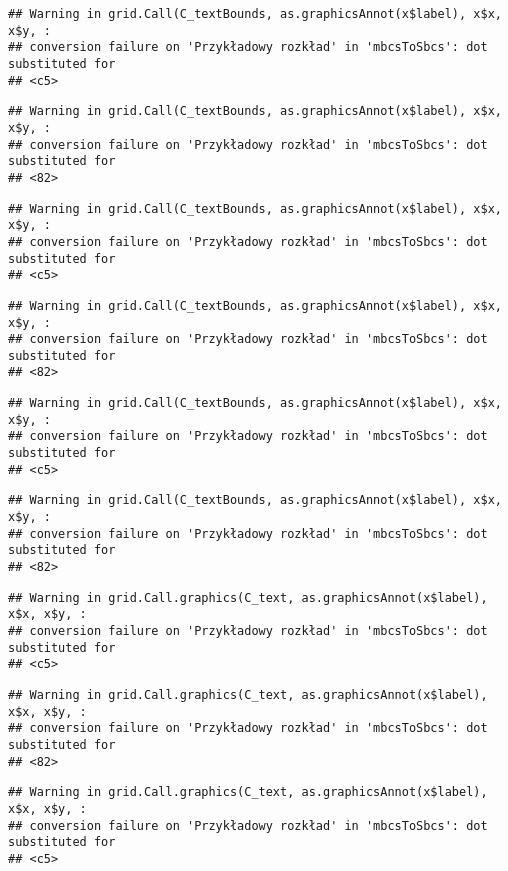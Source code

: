 \documentclass[
]{book}
\begin{document}
\begin{verbatim}
## Warning in grid.Call(C_textBounds, as.graphicsAnnot(x$label), x$x, x$y, :
## conversion failure on 'Przykładowy rozkład' in 'mbcsToSbcs': dot substituted for
## <c5>
\end{verbatim}

\begin{verbatim}
## Warning in grid.Call(C_textBounds, as.graphicsAnnot(x$label), x$x, x$y, :
## conversion failure on 'Przykładowy rozkład' in 'mbcsToSbcs': dot substituted for
## <82>
\end{verbatim}

\begin{verbatim}
## Warning in grid.Call(C_textBounds, as.graphicsAnnot(x$label), x$x, x$y, :
## conversion failure on 'Przykładowy rozkład' in 'mbcsToSbcs': dot substituted for
## <c5>
\end{verbatim}

\begin{verbatim}
## Warning in grid.Call(C_textBounds, as.graphicsAnnot(x$label), x$x, x$y, :
## conversion failure on 'Przykładowy rozkład' in 'mbcsToSbcs': dot substituted for
## <82>
\end{verbatim}

\begin{verbatim}
## Warning in grid.Call(C_textBounds, as.graphicsAnnot(x$label), x$x, x$y, :
## conversion failure on 'Przykładowy rozkład' in 'mbcsToSbcs': dot substituted for
## <c5>
\end{verbatim}

\begin{verbatim}
## Warning in grid.Call(C_textBounds, as.graphicsAnnot(x$label), x$x, x$y, :
## conversion failure on 'Przykładowy rozkład' in 'mbcsToSbcs': dot substituted for
## <82>
\end{verbatim}

\begin{verbatim}
## Warning in grid.Call.graphics(C_text, as.graphicsAnnot(x$label), x$x, x$y, :
## conversion failure on 'Przykładowy rozkład' in 'mbcsToSbcs': dot substituted for
## <c5>
\end{verbatim}

\begin{verbatim}
## Warning in grid.Call.graphics(C_text, as.graphicsAnnot(x$label), x$x, x$y, :
## conversion failure on 'Przykładowy rozkład' in 'mbcsToSbcs': dot substituted for
## <82>
\end{verbatim}

\begin{verbatim}
## Warning in grid.Call.graphics(C_text, as.graphicsAnnot(x$label), x$x, x$y, :
## conversion failure on 'Przykładowy rozkład' in 'mbcsToSbcs': dot substituted for
## <c5>
\end{verbatim}
\end{document}
